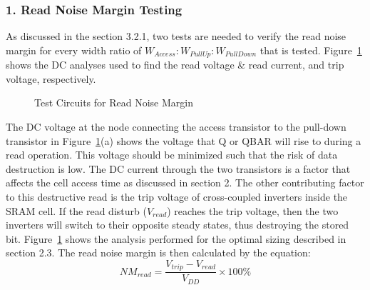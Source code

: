 \documentclass[10pt,letterpaper,onecolumn]{article}
\begin{document}
\subsubsection*{1. Read Noise Margin Testing}
As discussed in the section 3.2.1, two tests are needed to verify the read noise margin for every width ratio of $W_{Access}:W_{PullUp}:W_{PullDown}$ that is tested. Figure~\ref{fig:Vread_Vtrip} shows the DC analyses used to find the read voltage \& read current, and trip voltage, respectively.
\begin{figure}[htp]
    \centering
    \caption{Test Circuits for Read Noise Margin}
    \label{fig:Vread_Vtrip}
\end{figure}

The DC voltage at the node connecting the access transistor to the pull-down transistor in Figure~\ref{fig:Vread_Vtrip}(a) shows the voltage that Q or QBAR will rise to during a read operation. This voltage should be minimized such that the risk of data destruction is low. The DC current through the two transistors is a factor that affects the cell access time as discussed in section 2. The other contributing factor to this destructive read is the trip voltage of cross-coupled inverters inside the SRAM cell. If the read disturb ($V_{read}$) reaches the trip voltage, then the two inverters will switch to their opposite steady states, thus destroying the stored bit. Figure~\ref{fig:Vread_Vtrip} shows the analysis performed for the optimal sizing described in section 2.3. The read noise margin is then calculated by the equation:
\[ 
  NM_{read} = \frac{V_{trip} - V_{read}}{V_{DD}}\times100\%
\]
\end{document}
